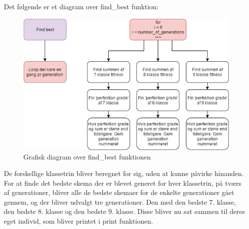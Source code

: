 Det følgende er et diagram over find_best funktion:
\begin{figure}[!h]
\includegraphics{partials/graphics/bestof.png}
\caption{Grafisk diagram over find_best funktionen}
\label{fig:diagrambestof}
\end{figure}

De forskellige klassetrin bliver beregnet for sig, uden at kunne påvirke hinanden. For at finde det bedste skema der er blevet generet for hver klassetrin, på tværs af generationer, bliver alle de bedste skemaer for de enkelte generationer gået gennem, og der bliver udvalgt tre generationer. Den med den bedste 7. klasse, den bedste 8. klasse og den bedste 9. klasse. Disse bliver nu sat sammen til deres eget individ, som bliver printet i print funktionen. 

